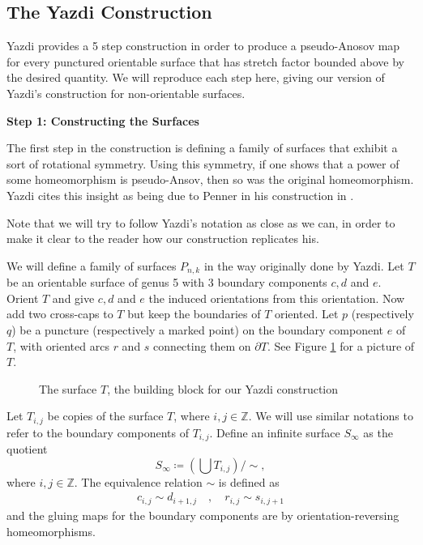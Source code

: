 \subsection{The Yazdi Construction}

Yazdi provides a 5 step construction in order to produce a pseudo-Anosov map for every punctured orientable surface that has stretch factor bounded above by the desired quantity. We will reproduce each step here, giving our version of Yazdi's construction for non-orientable surfaces.

\begin{center}
\textbf{Step 1: Constructing the Surfaces}
\end{center}

The first step in the construction is defining a family of surfaces that exhibit a sort of rotational symmetry. Using this symmetry, if one shows that a power of some homeomorphism is pseudo-Ansov, then so was the original homeomorphism. Yazdi cites this insight as being due to Penner in his construction in \cite{penner1991bounds}.

Note that we will try to follow Yazdi's notation as close as we can, in order to make it clear to the reader how our construction replicates his.

We will define a family of surfaces $P_{n,k}$ in the way originally done by Yazdi. Let $T$ be an orientable surface of genus 5 with 3 boundary components $c,d$ and $e$. Orient $T$ and give $c,d$ and $e$ the induced orientations from this orientation. Now add two cross-caps to $T$ but keep the boundaries of $T$ oriented. Let $p$ (respectively $q$) be a puncture (respectively a marked point) on the boundary component $e$ of $T$, with oriented arcs $r$ and $s$ connecting them on $\partial T$. See Figure \ref{fig:buildingblock} for a picture of $T$.

\begin{figure}[]
    \centering
    \caption{The surface $T$, the building block for our Yazdi construction}
    \label{fig:buildingblock}
\end{figure}

Let $T_{i,j}$ be copies of the surface $T$, where $i,j \in \mathbb{Z}$. We will use similar notations to refer to the boundary components of $T_{i,j}$. Define an infinite surface $S_\infty$ as the quotient
$$S_\infty \coloneqq \left( \bigcup T_{i,j} \right)/\sim,$$
where $i,j \in \mathbb{Z}$. The equivalence relation $\sim$ is defined as 
\begin{align*}
    c_{i,j} \sim d_{i+1,j} \hspace{1em}, \hspace{1em} r_{i,j} \sim s_{i,j+1}
\end{align*} 
and the gluing maps for the boundary components are by orientation-reversing homeomorphisms.

